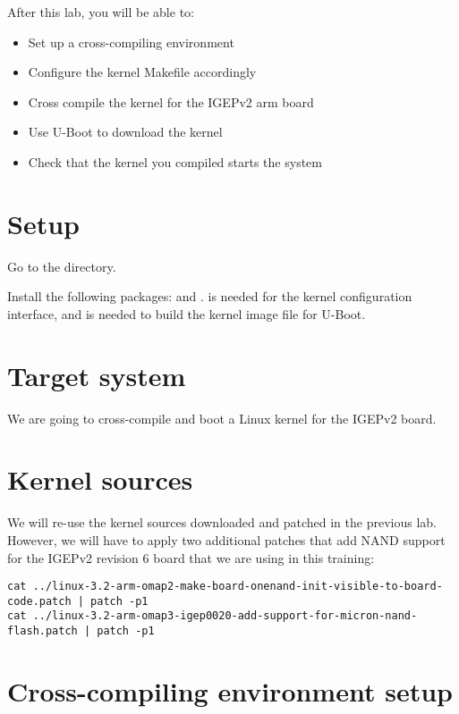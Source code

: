 
After this lab, you will be able to:
\begin{itemize}
\item Set up a cross-compiling environment
\item Configure the kernel Makefile accordingly
\item Cross compile the kernel for the IGEPv2 arm board
\item Use U-Boot to download the kernel
\item Check that the kernel you compiled starts the system
\end{itemize}

\section{Setup}

Go to the  directory.

Install the following packages:  and
.  is needed for the
 kernel configuration interface, and 
is needed to build the  kernel image file for U-Boot.

\section{Target system}

We are going to cross-compile and boot a Linux kernel for the IGEPv2
board.

\section{Kernel sources}

We will re-use the kernel sources downloaded and patched in the
previous lab. However, we will have to apply two additional patches
that add NAND support for the IGEPv2 revision 6 board that we are
using in this training:

\begin{verbatim}
cat ../linux-3.2-arm-omap2-make-board-onenand-init-visible-to-board-code.patch | patch -p1
cat ../linux-3.2-arm-omap3-igep0020-add-support-for-micron-nand-flash.patch | patch -p1
\end{verbatim}

\section{Cross-compiling environment setup}

